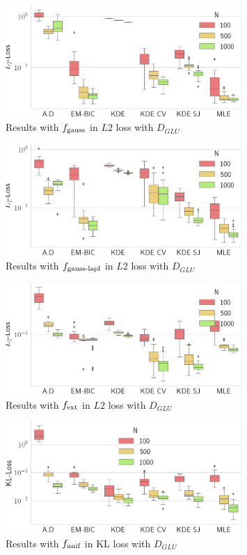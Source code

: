 \begin{figure}
\center
    \includegraphics[width=0.8\textwidth]{./TeX_files/res_gauss_L2_GLU.png}
    \caption{Results with $f_{\textnormal{gauss}}$ in $L2$ loss with $D_{GLU}$}
    \label{fig:res_gauss_L2_GLU}
\end{figure}
\begin{figure}
\center
    \includegraphics[width=0.8\textwidth]{./TeX_files/res_lapl_gauss_L2_GLU.png}
    \caption{Results with $f_{\textnormal{gauss-lapl}}$ in $L2$ loss with $D_{GLU}$}
    \label{fig:res_lapl_gauss_L2_GLU}
\end{figure}
\begin{figure}
\center
    \includegraphics[width=0.8\textwidth]{./TeX_files/res_lapl_gauss_not_dict_L2_GLU.png}
    \caption{Results with $f_{\textnormal{ext}}$ in $L2$ loss with $D_{GLU}$}
    \label{fig:res_ext_L2_GLU}
\end{figure}
\begin{figure}
\center
    \includegraphics[width=0.8\textwidth]{./TeX_files/res_uniform_KL_GLU.png}
    \caption{Results with $f_{\textnormal{unif}}$ in KL loss with $D_{GLU}$}
    \label{fig:res_uniform_KL_GLU}
\end{figure}
